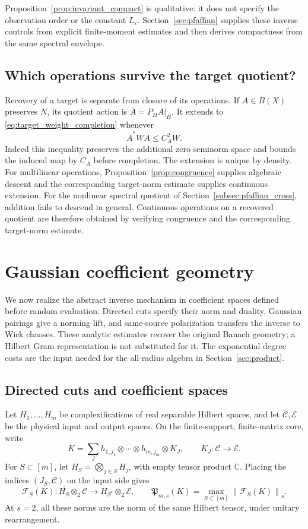 \documentclass[11pt,a4paper]{amsart}
\numberwithin{equation}{section}
\theoremstyle{definition}
\theoremstyle{remark}
\newcommand{\C}{\mathbb C}
\newcommand{\cC}{\mathcal C}
\newcommand{\cE}{\mathcal E}
\newcommand{\Flat}{\mathcal F}
\newcommand{\Prof}{\mathfrak P}
\newcommand{\norm}[1]{\left\lVert#1\right\rVert}
\begin{document}
Proposition~\ref{prop:invariant_compact} is qualitative: it does not specify the observation order or the constant $L_\varepsilon$. Section~\ref{sec:pfaffian} supplies these inverse controls from explicit finite-moment estimates and then derives compactness from the same spectral envelope.

\subsection{Which operations survive the target quotient?}
Recovery of a target is separate from closure of its operations. If $A\in B(X)$ preserves $N$, its quotient action is $\overline A=P_HA|_H$. It extends to \eqref{eq:target_weight_completion} whenever
\begin{equation}\label{eq:target_operation_weight}
 \overline A^*W\overline A\le C_A^2W.
\end{equation}
Indeed this inequality preserves the additional zero seminorm space and bounds the induced map by $C_A$ before completion. The extension is unique by density. For multilinear operations, Proposition~\ref{prop:congruence} supplies algebraic descent and the corresponding target-norm estimate supplies continuous extension. For the nonlinear spectral quotient of Section~\ref{subsec:pfaffian_cross}, addition fails to descend in general. Continuous operations on a recovered quotient are therefore obtained by verifying congruence and the corresponding target-norm estimate.


\section{Gaussian coefficient geometry}\label{sec:coeff}
We now realize the abstract inverse mechanism in coefficient spaces defined before random evaluation. Directed cuts specify their norm and duality, Gaussian pairings give a norming lift, and same-source polarization transfers the inverse to Wick chaoses. These analytic estimates recover the original Banach geometry; a Hilbert Gram representation is not substituted for it. The exponential degree costs are the input needed for the all-radius algebra in Section~\ref{sec:product}.

\subsection{Directed cuts and coefficient spaces}
Let $H_1,\ldots,H_m$ be complexifications of real separable Hilbert spaces, and let $\cC,\cE$ be the physical input and output spaces. On the finite-support, finite-matrix core, write
\[
 K=\sum_Jh_{1,j_1}\otimes\cdots\otimes h_{m,j_m}\otimes K_J,
 \qquad K_J:\cC\to\cE.
\]
For $S\subset[m]$, let $H_S=\bigotimes_{j\in S}H_j$, with empty tensor product $\C$. Placing the indices $(J_S,\cC)$ on the input side gives
\begin{equation}\label{eq:cuts}
 \Flat_S(K):\overline{H_S}\otimes_2\cC\longrightarrow H_{S^c}\otimes_2\cE,
 \qquad \Prof_{m,s}(K)=\max_{S\subset[m]}\norm{\Flat_S(K)}_s.
\end{equation}
At $s=2$, all these norms are the norm of the same Hilbert tensor, under unitary rearrangement.
\end{document}
